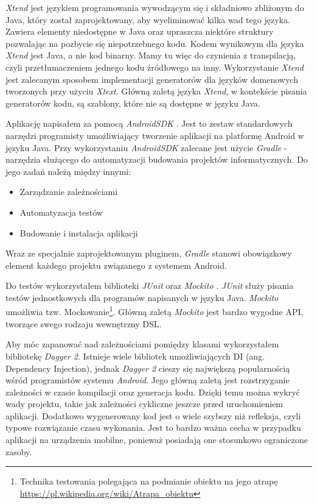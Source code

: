 \documentclass[openright]{xmgr}
\begin{document}
\textit{Xtend} jest językiem programowania wywodzącym się i składniowo zbliżonym do Java, który został zaprojektowany, aby wyeliminować kilka wad tego języka. Zawiera elementy niedostępne w Java oraz upraszcza niektóre struktury pozwalając na pozbycie się niepotrzebnego kodu. Kodem wynikowym dla języka \textit{Xtend} jest Java, a nie kod binarny. Mamy tu więc do czynienia z transpilacją, czyli przetłumaczeniem jednego kodu źródłowego na inny. Wykorzystanie \textit{Xtend} jest zalecanym sposobem implementacji generatorów dla języków domenowych tworzonych przy użyciu \textit{Xtext}. Główną zaletą języka \textit{Xtend}, w kontekście pisania generatorów kodu, są szablony, które nie są dostępne w języku Java.

Aplikację napisałem za pomocą \textit{AndroidSDK} \cite{AndroidSDK:2017:Doc}. Jest to zestaw standardowych narzędzi programisty umożliwiający tworzenie aplikacji na platformę Android w języku Java. Przy wykorzystaniu \textit{AndroidSDK} zalecane jest użycie \textit{Gradle} \cite{Gradle:2017:Doc} - narzędzia służącego do automatyzacji budowania projektów informatycznych. Do jego zadań należą między innymi:
\begin{itemize}
\item Zarządzanie zależnościami
\item Automatyzacja testów
\item Budowanie i instalacja aplikacji
\end{itemize}
Wraz ze specjalnie zaprojektowanym pluginem, \textit{Gradle} stanowi obowiązkowy element każdego projektu związanego z systemem Android.

Do testów wykorzystałem biblioteki \textit{JUnit} \cite{JUnit:2017:Doc} oraz \textit{Mockito} \cite{Mockito:2017:Doc}. \textit{JUnit} służy pisania testów jednostkowych dla programów napisanych w języku Java. \textit{Mockito} umożliwia tzw. Mockowanie\footnote{Technika testowania polegająca na podmianie obiektu na jego atrapę \url{https://pl.wikipedia.org/wiki/Atrapa_obiektu}}.  Główną zaletą \textit{Mockito} jest bardzo wygodne API, tworzące swego rodzaju wewnętrzny DSL.

Aby móc zapanować nad zależnościami pomiędzy klasami wykorzystałem bibliotekę \textit{Dagger 2}.
Istnieje wiele bibliotek umożliwiających DI (ang. Dependency Injection), jednak \textit{Dagger 2} cieszy się największą popularnością wśród programistów systemu \textit{Android}. Jego główną zaletą jest rozstrzyganie zależności w czasie kompilacji oraz generacja kodu. Dzięki temu można wykryć wady projektu, takie jak zależności cykliczne jeszcze przed uruchomieniem aplikacji. Dodatkowo wygenerowany kod jest o wiele szybszy niż refleksja, czyli typowe rozwiązanie czasu wykonania. Jest to bardzo ważna cecha w przypadku aplikacji na urządzenia mobilne, ponieważ posiadają one stosunkowo ograniczone zasoby. 
\end{document}
